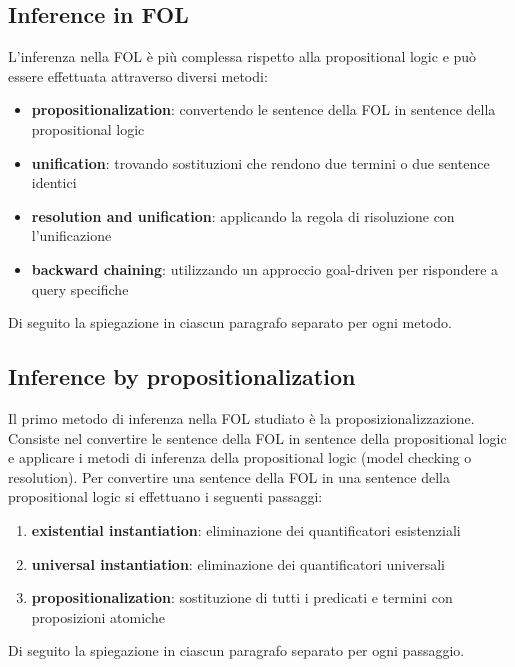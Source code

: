 \subsection{Inference in FOL}
L'inferenza nella FOL è più complessa rispetto alla propositional logic e può essere effettuata attraverso diversi metodi:
\begin{itemize}
	\item \textbf{propositionalization}: convertendo le sentence della FOL in sentence della propositional logic
	\item \textbf{unification}: trovando sostituzioni che rendono due termini o due sentence identici
	\item \textbf{resolution and unification}: applicando la regola di risoluzione con l'unificazione
	\item \textbf{backward chaining}: utilizzando un approccio goal-driven per rispondere a query specifiche
\end{itemize}
Di seguito la spiegazione in ciascun paragrafo separato per ogni metodo.

\subsection*{Inference by propositionalization}
Il primo metodo di inferenza nella FOL studiato è la proposizionalizzazione. Consiste nel convertire le sentence della FOL in
sentence della propositional logic e applicare i metodi di inferenza della propositional logic (model checking o resolution).
Per convertire una sentence della FOL in una sentence della propositional logic si effettuano i seguenti passaggi:
\begin{enumerate}
	\item \textbf{existential instantiation}: eliminazione dei quantificatori esistenziali
	\item \textbf{universal instantiation}: eliminazione dei quantificatori universali
	\item \textbf{propositionalization}: sostituzione di tutti i predicati e termini con proposizioni atomiche
\end{enumerate}
Di seguito la spiegazione in ciascun paragrafo separato per ogni passaggio.

